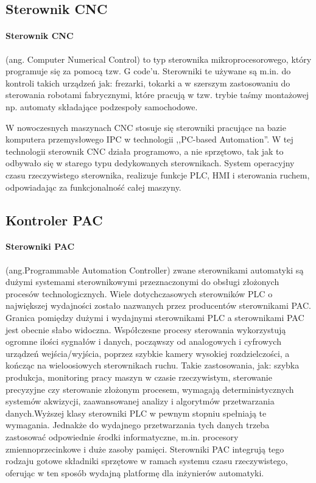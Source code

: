 \documentclass[]{report}
\begin{document}
\subsection{Sterownik CNC}
\paragraph{Sterownik CNC} (ang. Computer Numerical Control) to typ sterownika mikroprocesorowego, który programuje się za pomocą tzw. G code'u. Sterowniki te używane są m.in. do kontroli takich urządzeń jak: frezarki, tokarki a w szerszym zastosowaniu do sterowania robotami fabrycznymi, które pracują w tzw. trybie taśmy montażowej np. automaty składające podzespoły samochodowe.

W nowoczesnych maszynach CNC stosuje się sterowniki pracujące na bazie komputera przemysłowego IPC w technologii ,,PC-based Automation''. W tej technologii sterownik CNC działa programowo, a nie sprzętowo, tak jak to odbywało się w starego typu dedykowanych sterownikach. System operacyjny czasu rzeczywistego sterownika, realizuje funkcje PLC, HMI i sterowania ruchem, odpowiadając za funkcjonalność całej maszyny.

\subsection{Kontroler PAC}
\paragraph{Sterowniki PAC} (ang.Programmable Automation Controller) zwane sterownikami automatyki są dużymi systemami sterownikowymi przeznaczonymi do obsługi złożonych procesów technologicznych. Wiele dotychczasowych sterowników PLC o największej wydajności zostało nazwanych przez producentów sterownikami PAC. Granica pomiędzy dużymi i wydajnymi sterownikami PLC a sterownikami PAC jest obecnie słabo widoczna.
Współczesne procesy sterowania wykorzystują ogromne ilości sygnałów i danych, począwszy od analogowych i cyfrowych urządzeń wejścia/wyjścia, poprzez szybkie kamery wysokiej rozdzielczości, a kończąc na wieloosiowych
sterownikach ruchu. Takie zastosowania, jak: szybka produkcja, monitoring pracy maszyn w czasie rzeczywistym, sterowanie precyzyjne czy sterowanie złożonym procesem, wymagają deterministycznych systemów akwizycji, zaawansowanej analizy i algorytmów przetwarzania danych.Wyższej klasy sterowniki PLC w pewnym stopniu spełniają te wymagania. Jednakże do wydajnego przetwarzania tych danych trzeba zastosować odpowiednie środki informatyczne, m.in. procesory zmiennoprzecinkowe i duże zasoby pamięci. Sterowniki PAC integrują tego rodzaju gotowe składniki sprzętowe w ramach systemu czasu rzeczywistego, oferując w ten sposób wydajną platformę dla inżynierów automatyki.
\end{document}
